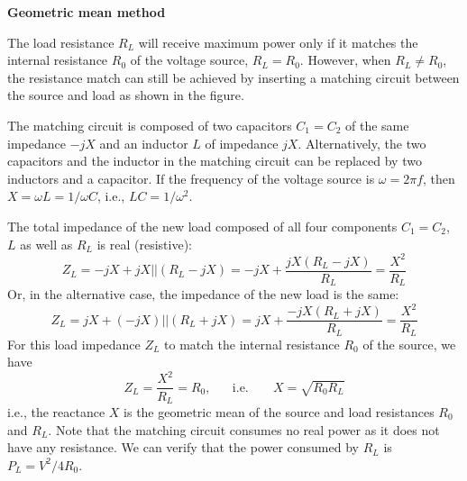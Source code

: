 \documentclass{article}
\begin{document}
{\bf Geometric mean method}

The load resistance $R_L$ will receive maximum power only if it matches the 
internal resistance $R_0$ of the voltage source, $R_L=R_0$. However, when
$R_L\ne R_0$, the resistance match can still be achieved by inserting a 
matching circuit between the source and load as shown in the figure. 

The matching circuit is composed of two capacitors $C_1=C_2$ of the same 
impedance $-jX$ and an inductor $L$ of impedance $jX$. Alternatively, the 
two capacitors and the inductor in the matching circuit can be replaced by 
two inductors and a capacitor. If the frequency of the voltage source is 
$\omega=2\pi f$, then $X=\omega L=1/\omega C$, i.e., $LC=1/\omega^2$.


The total impedance of the new load composed of all four components $C_1=C_2$,
$L$ as well as $R_L$ is real (resistive):
\begin{equation} 
  Z_L=-jX+jX || (R_L-jX)=-jX+\frac{jX(R_L-jX)}{R_L}=\frac{X^2}{R_L} 
\end{equation}
Or, in the alternative case, the impedance of the new load is the same:
\begin{equation}
  Z_L=jX+(-jX) || (R_L+jX)=jX+\frac{-jX(R_L+jX)}{R_L}=\frac{X^2}{R_L} 
\end{equation}
For this load impedance $Z_L$ to match the internal resistance $R_0$ of the 
source, we have
\begin{equation}
  Z_L=\frac{X^2}{R_L}=R_0,\;\;\;\;\;\;\mbox{i.e.}\;\;\;\;\;\;\;X=\sqrt{R_0R_L} 
\end{equation}
i.e., the reactance $X$ is the geometric mean of the source and load resistances
$R_0$ and $R_L$. Note that the matching circuit consumes no real power as it 
does not have any resistance. We can verify that the power consumed by $R_L$ is 
$P_L=V^2/4R_0$.
\end{document}
